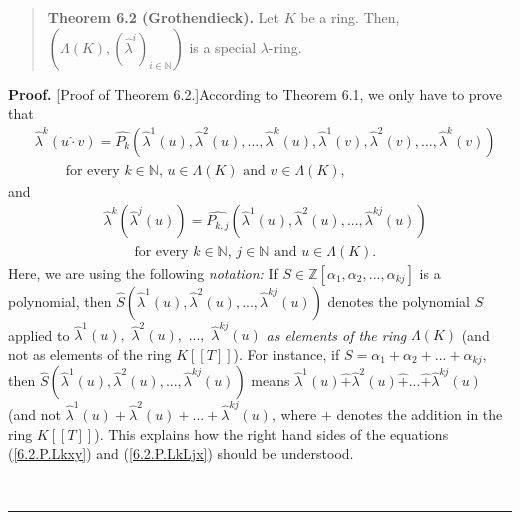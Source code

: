 \documentclass[numbers=enddot,12pt,final,onecolumn,notitlepage]{scrartcl}%
\newenvironment{proof}[1][Proof]{\noindent\textbf{#1.} }{\ \rule{0.5em}{0.5em}}
\begin{document}
\begin{quote}
\textbf{Theorem 6.2 (Grothendieck).} Let $K$ be a ring. Then, $\left(
\Lambda\left(  K\right)  ,\left(  \widehat{\lambda}^{i}\right)  _{i\in
\mathbb{N}}\right)  $ is a special $\lambda$-ring.
\end{quote}

\begin{proof}
[Proof of Theorem 6.2.]According to Theorem 6.1, we only have to prove that%
\begin{align}
&  \widehat{\lambda}^{k}\left(  u\widehat{\cdot}v\right)  =\widehat{P_{k}%
}\left(  \widehat{\lambda}^{1}\left(  u\right)  ,\widehat{\lambda}^{2}\left(
u\right)  ,...,\widehat{\lambda}^{k}\left(  u\right)  ,\widehat{\lambda}%
^{1}\left(  v\right)  ,\widehat{\lambda}^{2}\left(  v\right)
,...,\widehat{\lambda}^{k}\left(  v\right)  \right) \nonumber\\
&  \ \ \ \ \ \ \ \ \ \ \text{for every }k\in\mathbb{N}\text{, }u\in
\Lambda\left(  K\right)  \text{ and }v\in\Lambda\left(  K\right)  ,
\label{6.2.P.Lkxy}%
\end{align}
and%
\begin{align}
&  \widehat{\lambda}^{k}\left(  \widehat{\lambda}^{j}\left(  u\right)
\right)  =\widehat{P_{k,j}}\left(  \widehat{\lambda}^{1}\left(  u\right)
,\widehat{\lambda}^{2}\left(  u\right)  ,...,\widehat{\lambda}^{kj}\left(
u\right)  \right) \nonumber\\
&  \ \ \ \ \ \ \ \ \ \ \text{for every }k\in\mathbb{N}\text{, }j\in
\mathbb{N}\text{ and }u\in\Lambda\left(  K\right)  . \label{6.2.P.LkLjx}%
\end{align}
Here, we are using the following \textit{notation:} If $S\in\mathbb{Z}\left[
\alpha_{1},\alpha_{2},...,\alpha_{kj}\right]  $ is a polynomial, then
$\widehat{S}\left(  \widehat{\lambda}^{1}\left(  u\right)  ,\widehat{\lambda
}^{2}\left(  u\right)  ,...,\widehat{\lambda}^{kj}\left(  u\right)  \right)  $
denotes the polynomial $S$ applied to $\widehat{\lambda}^{1}\left(  u\right)
,$ $\widehat{\lambda}^{2}\left(  u\right)  ,$ $...,$ $\widehat{\lambda}%
^{kj}\left(  u\right)  $ \textit{as elements of the ring }$\Lambda\left(
K\right)  $ (and not as elements of the ring $K\left[  \left[  T\right]
\right]  $). For instance, if $S=\alpha_{1}+\alpha_{2}+...+\alpha_{kj},$ then
$\widehat{S}\left(  \widehat{\lambda}^{1}\left(  u\right)  ,\widehat{\lambda
}^{2}\left(  u\right)  ,...,\widehat{\lambda}^{kj}\left(  u\right)  \right)  $
means $\widehat{\lambda}^{1}\left(  u\right)  \widehat{+}\widehat{\lambda}%
^{2}\left(  u\right)  \widehat{+}...\widehat{+}\widehat{\lambda}^{kj}\left(
u\right)  $ (and not $\widehat{\lambda}^{1}\left(  u\right)  +\widehat{\lambda
}^{2}\left(  u\right)  +...+\widehat{\lambda}^{kj}\left(  u\right)  $, where
$+$ denotes the addition in the ring $K\left[  \left[  T\right]  \right]  $).
This explains how the right hand sides of the equations (\ref{6.2.P.Lkxy}) and
(\ref{6.2.P.LkLjx}) should be understood.


\end{proof}
\end{document}
